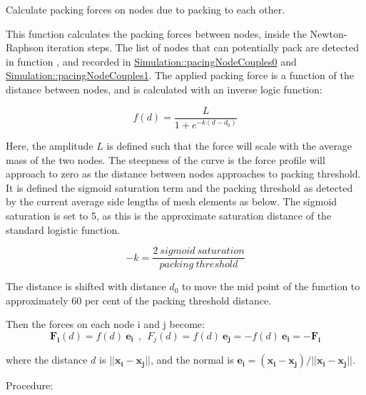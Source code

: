 Calculate packing forces on nodes due to packing to each other. 

This function calculates the packing forces between nodes, inside the Newton-\/\+Raphson iteration steps. The list of nodes that can potentially pack are detected in function , and recorded in \hyperlink{classSimulation_aeb78dddb085445b34d6ed6efee996183}{Simulation\+::pacing\+Node\+Couples0} and \hyperlink{classSimulation_ab67e69811ef54ec761cce2b4c76fb568}{Simulation\+::pacing\+Node\+Couples1}. The applied packing force is a function of the distance between nodes, and is calculated with an inverse logic function\+:

\[ f\left( d \right) = \frac{L}{1+ e^{-k\left(d-d_{0}\right)}} \]

Here, the amplitude $ L $ is defined such that the force will scale with the average mass of the two nodes. The steepness of the curve is the force profile will approach to zero as the distance between nodes approaches to packing threshold. It is defined the sigmoid saturation term and the packing threshold as detected by the current average side lengths of mesh elements as below. The sigmoid saturation is set to 5, as this is the approximate saturation distance of the standard logistic function.

\[ -k = \frac{2\:sigmoid\:saturation}{packing\:threshold} \]

The distance is shifted with distance $ d_{0} $ to move the mid point of the function to approximately 60 per cent of the packing threshold distance.



Then the forces on each node i and j become\+: \[ \mathbf{F_{i}}\left( d \right) = f\left( d \right)\: \mathbf{e_{i}}\:\:,\:\: F_{j}\left( d \right) = f\left( d \right)\: \mathbf{e_{j}}=-f\left( d \right)\: \mathbf{e_{i}}=-\mathbf{F_{i}} \]

where the distance $ d $ is $ ||\mathbf{x_{i}}-\mathbf{x_{j}} || $, and the normal is $ \mathbf{e_{i}} = \left( \mathbf{x_{i}}-\mathbf{x_{j}} \right) / ||\mathbf{x_{i}}-\mathbf{x_{j}} || $.

Procedure\+:


